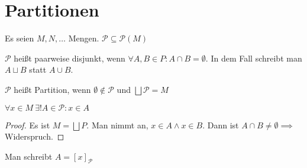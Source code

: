 \section{Partitionen}
\begin{definition}
  Es seien $M, N, \dots$ Mengen. $\mathscr{P} \subseteq \mathscr{P}(M)$

  $\mathscr{P}$ heißt paarweise disjunkt, wenn $\forall A, B \in P: A \cap B = \emptyset$. In dem Fall schreibt man $A \sqcup B$ statt $A \cup B$.

  $\mathscr{P}$ heißt Partition, wenn $\emptyset \not\in \mathscr{P}$ und $\bigsqcup \mathscr{P} = M$
\end{definition}
\begin{theorem}
  $\forall x \in M\: \exists! A \in \mathscr{P}: x \in A$
\end{theorem}
\begin{proof}
  Es ist $M = \bigsqcup P$. Man nimmt an, $x \in A \wedge x \in B$. Dann ist
  $A \cap B \ne \emptyset \implies$ Widerspruch.
\end{proof}
\begin{remark}
  Man schreibt $A = [x]_{\mathscr{P}}$
\end{remark}

